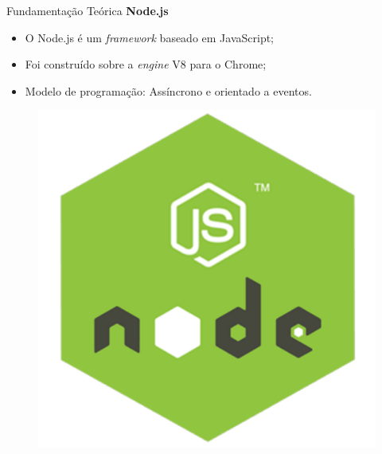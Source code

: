 \documentclass{libs/ufc_format}
\begin{document}
\begin{frame}{Fundamentação Teórica}
    \textbf{Node.js}\nocite{nodejs}\let\thefootnote\relax{}
    \begin{multicols}{2}
        \begin{itemize}
            \item O Node.js é um \textit{framework} baseado em JavaScript;
            \item Foi construído sobre a \textit{engine} V8 para o Chrome;
            \item Modelo de programação: Assíncrono e orientado a eventos.
        \end{itemize}
        \begin{figure}[H]
            \centering
            \includegraphics[width=0.8\linewidth]{figuras/logo-nodejs.pdf}
            \captionsetup{justification=centering}
            \label{fig:modelo-rest-api}
        \end{figure}
    \end{multicols}
\end{frame}
\end{document}

